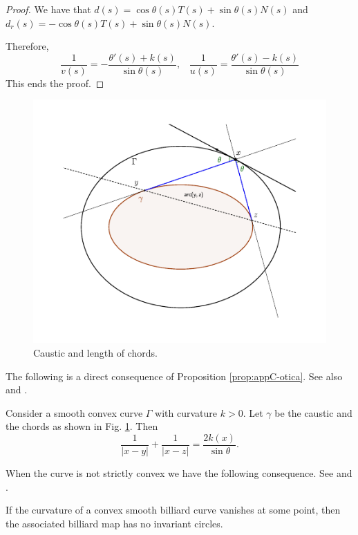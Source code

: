 \begin{proof} We have that $d(s)=\cos\theta(s) T(s)+\sin\theta(s) N(s)$ and $d_r(s)=-\cos\theta(s) T(s)+\sin\theta(s) N(s).$
 
 Therefore,
 \[ \frac{1}{v(s)}=-\frac{\theta'(s)+k(s)}{\sin\theta(s)},\;\;\;\frac{1}{u(s)}=\frac{\theta'(s)-k(s)}{\sin\theta(s)}\]
 This ends the proof.
\end{proof}
  \begin{figure}[H]
	\begin{center}
		\def\svgwidth{0.75\textwidth}
	 \includegraphics[scale=0.8]{zappC/pics/pics_appC_140_corda_comprimento.pdf}
		\caption {  Caustic and length of chords. \label{fig:appC-corda3}}
	\end{center}
\end{figure}

The following is a direct consequence of Proposition  \ref{prop:appC-otica}. See also \cite{katok3-1995}  and \cite{woj-1986}.

\begin{corollary}
    Consider a smooth convex curve $\Gamma$ with curvature $k>0.$ Let  $\gamma$ be the caustic and the chords as shown in Fig. \ref{fig:appC-corda3}. Then
    \[\frac{1}{|x-y|}+\frac{1}{|x-z|} =\frac{2k(x)}{\sin\theta}. \]
\end{corollary}

When the curve is not strictly convex we   have  the following consequence.  See \cite{mather-1984} and \cite[Chapter 3]{rozikov2018}.

\begin{theorem}   If the curvature of a convex smooth billiard curve vanishes at some point, then the associated billiard   map has no invariant circles.
 \end{theorem}

